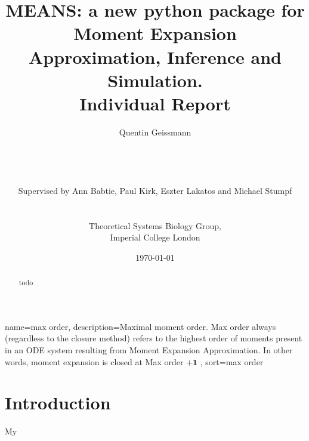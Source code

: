 \documentclass[11pt,a4paper]{article}
\begin{document}
\listoftodos
\newpage

\title{MEANS: a new python package for Moment Expansion Approximation, Inference and Simulation.\\
Individual Report}
\author{Quentin Geissmann\\
\\	
\\
\\
\\
Supervised by Ann Babtie, Paul Kirk, Eszter Lakatos and Michael Stumpf\\
\\
\\
Theoretical Systems Biology Group,\\
Imperial College London
}
\date{\today}

\clearpage\maketitle
\thispagestyle{empty}
\newpage{}


\begin{abstract}
todo 
\end{abstract}

\tableofcontents


{
  name=max order,
  description={Maximal moment order. Max order always (regardless to the closure method) refers to the highest order of 
  moments present in an ODE system resulting from Moment Expansion Approximation. In other words, moment expansion is closed at Max order $\mathbf{+1}$
   },
  sort=max order
}

\newpage{}

\section{Introduction}


My
\end{document}
